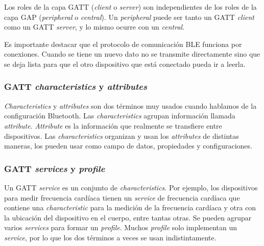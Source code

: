 Los roles de la capa GATT (\textit{client} o \textit{server}) son independientes de los roles de la capa GAP (\textit{peripheral} o \textit{central}). Un \textit{peripheral} puede ser tanto un GATT \textit{client} como un GATT \textit{server}, y lo mismo ocurre con un \textit{central}.

Es importante destacar que el protocolo de comunicación BLE funciona por conexiones. Cuando se tiene un nuevo dato no se transmite directamente sino que se deja lista para que el otro dispositivo que está conectado pueda ir a leerla. 

\subsubsection{GATT \textit{characteristics} y \textit{attributes}}
\textit{Characteristics} y \textit{attributes} son dos términos muy usados cuando hablamos de la configuración Bluetooth. Las \textit{characteristics} agrupan información llamada \textit{attribute}. \textit{Attribute} es la información que realmente se transfiere entre dispositivos. Las \textit{characteristics} organizan y usan los \textit{attributes} de distintas maneras, los pueden usar como campo de datos, propiedades y configuraciones. 

\subsubsection{GATT \textit{services} y \textit{profile}}
Un GATT \textit{service} es un conjunto de \textit{characteristics}. Por ejemplo, los dispositivos para medir frecuencia cardíaca tienen un \textit{service} de frecuencia cardíaca que contiene una \textit{characteristic} para la medición de la frecuencia cardíaca y otra con la ubicación del dispositivo en el cuerpo, entre tantas otras. Se pueden agrupar varios \textit{services} para formar un \textit{profile}. Muchos \textit{profile} solo implementan un \textit{service}, por lo que los dos términos a veces se usan indistintamente.

